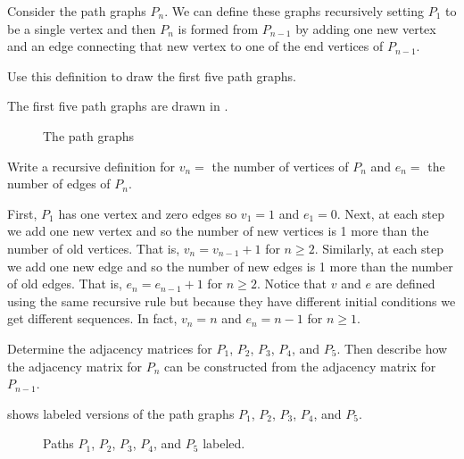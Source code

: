 \begin{exam}
\label{exam_rec_path_graphs}
    Consider the path graphs $P_n$.  We can define these graphs recursively setting $P_1$ to be a single vertex and then $P_n$ is formed from $P_{n-1}$ by adding one new vertex and an edge connecting that new vertex to one of the end vertices of $P_{n-1}$.  
    \begin{actpart}
        \item Use this definition to draw the first five path graphs.
            \begin{soln}
            The first five path graphs are drawn in .
                \begin{figure}[hbtp]
                    \centering
                    
                    \caption{The path graphs}
                    \label{figure_path_graphs_recursive}
                \end{figure}
            \end{soln}
        \item Write a recursive definition for $v_n=$ the number of vertices of $P_n$ and $e_n=$ the number of edges of $P_n$.
            \begin{soln}
                First, $P_1$ has one vertex and zero edges so $v_1=1$ and $e_1=0$.  Next, at each step we add one new vertex and so the number of new vertices is 1 more than the number of old vertices.  That is, $v_n=v_{n-1}+1$ for $n \ge 2$.  Similarly, at each step we add one new edge and so the number of new edges is 1 more than the number of old edges. That is, $e_n=e_{n-1}+1$ for $n \ge 2$. Notice that $v$ and $e$ are defined using the same recursive rule but  because they have different initial conditions we get different sequences.  In fact, $v_n=n$ and $e_n=n-1$ for $n \ge 1$.
            \end{soln}
        \item Determine the adjacency matrices for $P_1$, $P_2$, $P_3$, $P_4$, and $P_5$. Then describe how the adjacency matrix for $P_n$ can be constructed from the adjacency matrix for $P_{n-1}$.
            \begin{soln}
                 shows labeled versions of the path graphs $P_1$, $P_2$, $P_3$, $P_4$, and $P_5$.

                    \begin{figure}
                        \centering
                        
                        \caption{Paths $P_1$, $P_2$, $P_3$, $P_4$, and $P_5$ labeled.}
                        \label{fig_paths12345_labeled}
                    \end{figure}


\end{soln}
\end{actpart}
\end{exam}
